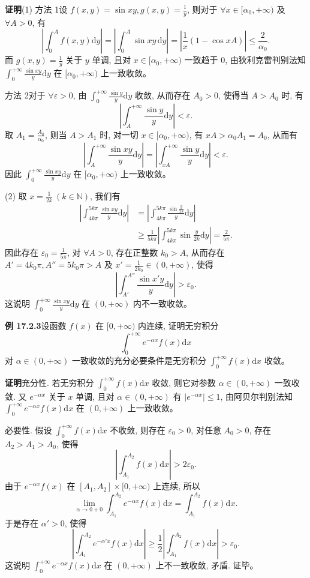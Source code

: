 \documentclass[UTF8,12pt,a4paper,fontset=fandol]{ctexart}
\begin{document}
\noindent\textbf{证明}\quad (1) 方法 1\quad 设 $f(x,y)=\sin xy,g(x,y)=\frac1y$, 则对于 $\forall x\in[\alpha_0,+\infty)$ 及 $\forall A>0$, 有
\[
  \left|\int_0^A f(x,y)\mathrm dy\right|
  =
  \left|\int_0^A\sin xy\,\mathrm dy\right|
  =
  \left|\frac1x(1-\cos xA)\right|
  \leqslant\frac2{\alpha_0}.
\]
而 $g(x,y)=\frac1y$ 关于 $y$ 单调, 且对 $x\in[\alpha_0,+\infty)$ 一致趋于 $0$, 由狄利克雷判别法知 $\int_0^{+\infty}\frac{\sin xy}{y}\mathrm dy$ 在 $[\alpha_0,+\infty)$ 上一致收敛。

方法 2\quad 对于 $\forall\varepsilon>0$, 由 $\int_0^{+\infty}\frac{\sin y}{y}\mathrm dy$ 收敛, 从而存在 $A_0>0$, 使得当 $A>A_0$ 时, 有
\[
  \left|\int_A^{+\infty}\frac{\sin y}{y}\mathrm dy\right|<\varepsilon.
\]
取 $A_1=\frac{A_0}{\alpha_0}$, 则当 $A>A_1$ 时, 对一切 $x\in[\alpha_0,+\infty)$, 有 $xA>\alpha_0 A_1=A_0$, 从而有
\[
  \left|\int_A^{+\infty}\frac{\sin xy}{y}\mathrm dy\right|
  =
  \left|\int_{xA}^{+\infty}\frac{\sin y}{y}\mathrm dy\right|
  <\varepsilon.
\]
因此 $\int_0^{+\infty}\frac{\sin xy}{y}\mathrm dy$ 在 $[\alpha_0,+\infty)$ 上一致收敛。

(2) 取 $x=\frac1{2k}\ (k\in\mathbb N)$, 我们有
\[
\begin{aligned}
  \left|\int_{4k\pi}^{5k\pi}\frac{\sin xy}{y}\mathrm dy\right|
  &=\left|\int_{4k\pi}^{5k\pi}\frac{\sin\frac{y}{2k}}{y}\mathrm dy\right|\\
  &\geqslant \frac1{5k\pi}\left|\int_{4k\pi}^{5k\pi}\sin\frac{y}{2k}\mathrm dy\right|
  =\frac2{5\pi}.
\end{aligned}
\]
因此存在 $\varepsilon_0=\frac1{5\pi}$, 对 $\forall A>0$, 存在正整数 $k_0>A$, 从而存在 $A'=4k_0\pi,A''=5k_0\pi>A$ 及 $x'=\frac1{2k_0}\in(0,+\infty)$, 使得
\[
  \left|\int_{A'}^{A''}\frac{\sin x'y}{y}\mathrm dy\right|>\varepsilon_0.
\]
这说明 $\int_0^{+\infty}\frac{\sin xy}{y}\mathrm dy$ 在 $(0,+\infty)$ 内不一致收敛。

\noindent\textbf{例 17.2.3}\quad 设函数 $f(x)$ 在 $[0,+\infty)$ 内连续, 证明无穷积分
\[
  \int_0^{+\infty}e^{-\alpha x}f(x)\mathrm dx
\]
对 $\alpha\in(0,+\infty)$ 一致收敛的充分必要条件是无穷积分 $\int_0^{+\infty}f(x)\mathrm dx$ 收敛。

\noindent\textbf{证明}\quad 充分性. 若无穷积分 $\int_0^{+\infty}f(x)\mathrm dx$ 收敛, 则它对参数 $\alpha\in(0,+\infty)$ 一致收敛. 又 $e^{-\alpha x}$ 关于 $x$ 单调, 且对 $\alpha\in(0,+\infty)$ 有 $|e^{-\alpha x}|\leqslant1$, 由阿贝尔判别法知 $\int_0^{+\infty}e^{-\alpha x}f(x)\mathrm dx$ 在 $(0,+\infty)$ 上一致收敛。

必要性. 假设 $\int_0^{+\infty}f(x)\mathrm dx$ 不收敛, 则存在 $\varepsilon_0>0$, 对任意 $A_0>0$, 存在 $A_2>A_1>A_0$, 使得
\[
  \left|\int_{A_1}^{A_2}f(x)\mathrm dx\right|>2\varepsilon_0.
\]
由于 $e^{-\alpha x}f(x)$ 在 $[A_1,A_2]\times[0,+\infty)$ 上连续, 所以
\[
  \lim_{\alpha\to0+0}\int_{A_1}^{A_2}e^{-\alpha x}f(x)\mathrm dx
  =\int_{A_1}^{A_2}f(x)\mathrm dx.
\]
于是存在 $\alpha'>0$, 使得
\[
  \left|\int_{A_1}^{A_2}e^{-\alpha'x}f(x)\mathrm dx\right|
  \geqslant \frac12\left|\int_{A_1}^{A_2}f(x)\mathrm dx\right|
  >\varepsilon_0.
\]
这说明 $\int_0^{+\infty}e^{-\alpha x}f(x)\mathrm dx$ 在 $(0,+\infty)$ 上不一致收敛, 矛盾. 证毕。
\end{document}
